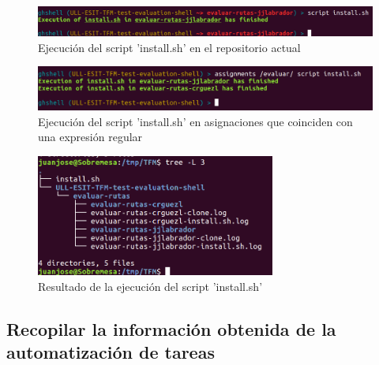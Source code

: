     	\begin{figure}[H]
		\begin{center}
		\includegraphics[width=1\textwidth]{images/ghshell7-3}
		\caption{Ejecución del script 'install.sh' en el repositorio actual}
		\label{fig:ghshell7-3}
		\end{center}
		\end{figure}
		
        \begin{figure}[H]
		\begin{center}
		\includegraphics[width=1\textwidth]{images/ghshell7-1}
		\caption{Ejecución del script 'install.sh' en asignaciones que coinciden con una expresión regular}
		\label{fig:ghshell7-1}
		\end{center}
		\end{figure}	
		
		\begin{figure}[H]
		\begin{center}
		\includegraphics[width=0.7\textwidth]{images/ghshell7-2}
		\caption{Resultado de la ejecución del script 'install.sh'}
		\label{fig:ghshell7-2}
		\end{center}
		\end{figure}
		
\subsection{Recopilar la información obtenida de la automatización de tareas}
\label{subsec:3.1.4}


